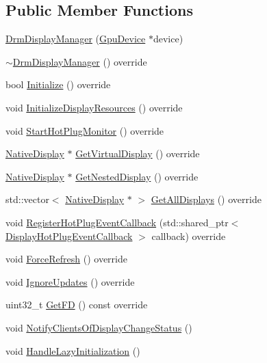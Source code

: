 \subsection*{Public Member Functions}
\begin{DoxyCompactItemize}
\item 
\mbox{\hyperlink{classhwcomposer_1_1DrmDisplayManager_a7fa49119fbf2a4aece3a9e299e9a9919}{Drm\+Display\+Manager}} (\mbox{\hyperlink{classhwcomposer_1_1GpuDevice}{Gpu\+Device}} $\ast$device)
\item 
\mbox{\hyperlink{classhwcomposer_1_1DrmDisplayManager_a740d07df781fec91467ed8f6f240b407}{$\sim$\+Drm\+Display\+Manager}} () override
\item 
bool \mbox{\hyperlink{classhwcomposer_1_1DrmDisplayManager_a1597ef6208030337c9554b70dcdf0a95}{Initialize}} () override
\item 
void \mbox{\hyperlink{classhwcomposer_1_1DrmDisplayManager_a775eee42523dabde8e4187770cbe9c6c}{Initialize\+Display\+Resources}} () override
\item 
void \mbox{\hyperlink{classhwcomposer_1_1DrmDisplayManager_a103a45f1e7e31c813dc7e185e244d944}{Start\+Hot\+Plug\+Monitor}} () override
\item 
\mbox{\hyperlink{classhwcomposer_1_1NativeDisplay}{Native\+Display}} $\ast$ \mbox{\hyperlink{classhwcomposer_1_1DrmDisplayManager_a80e39b4389e271ed5a72421c46ce5f36}{Get\+Virtual\+Display}} () override
\item 
\mbox{\hyperlink{classhwcomposer_1_1NativeDisplay}{Native\+Display}} $\ast$ \mbox{\hyperlink{classhwcomposer_1_1DrmDisplayManager_ae3df43b4c4c9cc1181ec13cbefd764f1}{Get\+Nested\+Display}} () override
\item 
std\+::vector$<$ \mbox{\hyperlink{classhwcomposer_1_1NativeDisplay}{Native\+Display}} $\ast$ $>$ \mbox{\hyperlink{classhwcomposer_1_1DrmDisplayManager_acff7605550c750e5f799f698e9b82d2a}{Get\+All\+Displays}} () override
\item 
void \mbox{\hyperlink{classhwcomposer_1_1DrmDisplayManager_ab11e4353cddc68652abcae61dd26027d}{Register\+Hot\+Plug\+Event\+Callback}} (std\+::shared\+\_\+ptr$<$ \mbox{\hyperlink{classhwcomposer_1_1DisplayHotPlugEventCallback}{Display\+Hot\+Plug\+Event\+Callback}} $>$ callback) override
\item 
void \mbox{\hyperlink{classhwcomposer_1_1DrmDisplayManager_a254ab8fd550f20f056c2ec1e458442c9}{Force\+Refresh}} () override
\item 
void \mbox{\hyperlink{classhwcomposer_1_1DrmDisplayManager_ac10c8fb07bf822c4430cd54722ceee16}{Ignore\+Updates}} () override
\item 
uint32\+\_\+t \mbox{\hyperlink{classhwcomposer_1_1DrmDisplayManager_aed1b4e61f4bbda4069138675156a9564}{Get\+FD}} () const override
\item 
void \mbox{\hyperlink{classhwcomposer_1_1DrmDisplayManager_a087e35e0b0be34e4ff5efdb37c8a5684}{Notify\+Clients\+Of\+Display\+Change\+Status}} ()
\item 
void \mbox{\hyperlink{classhwcomposer_1_1DrmDisplayManager_a9d52e745e20b0872b57d04ebdd3d12b6}{Handle\+Lazy\+Initialization}} ()
\end{DoxyCompactItemize}
